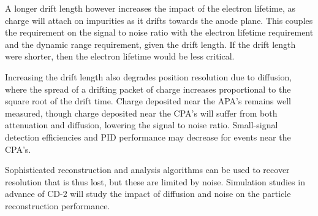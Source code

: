 A longer drift length however increases the impact of the electron
lifetime, as charge will attach on impurities as it drifts towards the
anode plane.  This couples the requirement on the signal to noise
ratio with the electron lifetime requirement and the dynamic range
requirement, given the drift length.  If the drift length were
shorter, then the electron lifetime would be less critical.

Increasing the drift length also degrades position resolution due to diffusion, where the
spread of a drifting packet of charge increases proportional to the square root of the
drift time.  Charge deposited near the APA's remains well measured, though charge deposited
near the CPA's will suffer from both attenuation and diffusion, lowering the signal to noise
ratio.  Small-signal detection efficiencies and PID performance may decrease for events
near the CPA's.

Sophisticated reconstruction and analysis algorithms can be used to recover resolution that
is thus lost, but these are limited by noise.  Simulation studies in advance of CD-2 will
study the impact of diffusion and noise on the particle reconstruction performance.

